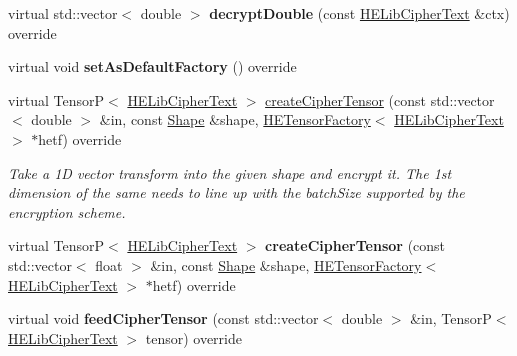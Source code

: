 \begin{DoxyCompactItemize}
\item 
\mbox{\label{classHELibCipherTextFactory_afce0ddd6b5d8215291b5a7d900010b1d}} 
virtual std\+::vector$<$ double $>$ {\bfseries decrypt\+Double} (const \hyperlink{classHELibCipherText}{H\+E\+Lib\+Cipher\+Text} \&ctx) override
\item 
\mbox{\label{classHELibCipherTextFactory_a989b38ed86ad24c4c1da3d73b528af28}} 
virtual void {\bfseries set\+As\+Default\+Factory} () override
\item 
\mbox{\label{classHELibCipherTextFactory_a4cf13021fcce822cd1f0b5f08452cbbf}} 
virtual TensorP$<$ \hyperlink{classHELibCipherText}{H\+E\+Lib\+Cipher\+Text} $>$ \hyperlink{classHELibCipherTextFactory_a4cf13021fcce822cd1f0b5f08452cbbf}{create\+Cipher\+Tensor} (const std\+::vector$<$ double $>$ \&in, const \hyperlink{classShape}{Shape} \&shape, \hyperlink{classHETensorFactory}{H\+E\+Tensor\+Factory}$<$ \hyperlink{classHELibCipherText}{H\+E\+Lib\+Cipher\+Text} $>$ $\ast$hetf) override
\begin{DoxyCompactList}\small\item\em Take a 1D vector transform into the given shape and encrypt it. The 1st dimension of the same needs to line up with the batch\+Size supported by the encryption scheme. \end{DoxyCompactList}\item 
\mbox{\label{classHELibCipherTextFactory_a0c414fd65bc9d49c7a6ab349da26522d}} 
virtual TensorP$<$ \hyperlink{classHELibCipherText}{H\+E\+Lib\+Cipher\+Text} $>$ {\bfseries create\+Cipher\+Tensor} (const std\+::vector$<$ float $>$ \&in, const \hyperlink{classShape}{Shape} \&shape, \hyperlink{classHETensorFactory}{H\+E\+Tensor\+Factory}$<$ \hyperlink{classHELibCipherText}{H\+E\+Lib\+Cipher\+Text} $>$ $\ast$hetf) override
\item 
\mbox{\label{classHELibCipherTextFactory_a9bdb6c404006f7876a7218a6fa48ba98}} 
virtual void {\bfseries feed\+Cipher\+Tensor} (const std\+::vector$<$ double $>$ \&in, TensorP$<$ \hyperlink{classHELibCipherText}{H\+E\+Lib\+Cipher\+Text} $>$ tensor) override
\item 
\mbox{\label{classHELibCipherTextFactory_ae445259d96707e99490045ebb90b67d2}} 

\end{DoxyCompactItemize}
